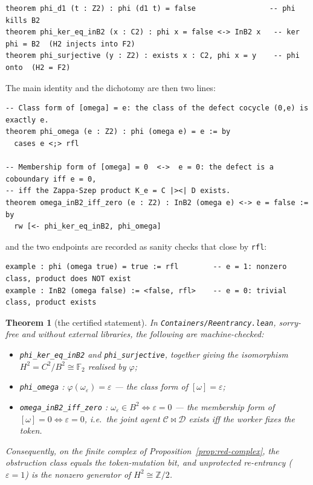 \documentclass[11pt]{amsart}
\newtheorem{theorem}{Theorem}[section]
\theoremstyle{definition}
\theoremstyle{remark}
\newcommand{\C}{\mathcal{C}}
\newcommand{\D}{\mathcal{D}}
\newcommand{\FF}{\mathbb{F}_2}
\begin{document}
\begin{lstlisting}[style=lean]
theorem phi_d1 (t : Z2) : phi (d1 t) = false                 -- phi kills B2
theorem phi_ker_eq_inB2 (x : C2) : phi x = false <-> InB2 x   -- ker phi = B2  (H2 injects into F2)
theorem phi_surjective (y : Z2) : exists x : C2, phi x = y    -- phi onto  (H2 = F2)
\end{lstlisting}

\noindent The main identity and the dichotomy are then two lines:

\begin{lstlisting}[style=lean]
-- Class form of [omega] = e: the class of the defect cocycle (0,e) is exactly e.
theorem phi_omega (e : Z2) : phi (omega e) = e := by
  cases e <;> rfl

-- Membership form of [omega] = 0  <->  e = 0: the defect is a coboundary iff e = 0,
-- iff the Zappa-Szep product K_e = C |><| D exists.
theorem omega_inB2_iff_zero (e : Z2) : InB2 (omega e) <-> e = false := by
  rw [<- phi_ker_eq_inB2, phi_omega]
\end{lstlisting}

\noindent and the two endpoints are recorded as sanity checks that close by \texttt{rfl}:

\begin{lstlisting}[style=lean]
example : phi (omega true) = true := rfl        -- e = 1: nonzero class, product does NOT exist
example : InB2 (omega false) := <false, rfl>    -- e = 0: trivial class, product exists
\end{lstlisting}

\begin{theorem}[the certified statement]\label{thm:lean}
In \texttt{Containers/Reentrancy.lean}, sorry-free and without external libraries, the following are
machine-checked:
\begin{itemize}
\item \texttt{phi\_ker\_eq\_inB2} and \texttt{phi\_surjective}, together giving the isomorphism
  $H^2=C^2/B^2\cong\FF$ realised by $\varphi$;
\item \texttt{phi\_omega} : $\varphi(\omega_\varepsilon)=\varepsilon$ --- the class form of
  $[\omega]=\varepsilon$;
\item \texttt{omega\_inB2\_iff\_zero} : $\omega_\varepsilon\in B^2\iff\varepsilon=0$ --- the membership
  form of $[\omega]=0\iff\varepsilon=0$, i.e.\ the joint agent $\C\bowtie\D$ exists iff the worker fixes
  the token.
\end{itemize}
Consequently, on the finite complex of Proposition~\ref{prop:red-complex}, the obstruction class equals
the token-mutation bit, and unprotected re-entrancy ($\varepsilon=1$) is the nonzero generator of
$H^2\cong\mathbb Z/2$.
\end{theorem}
\end{document}
